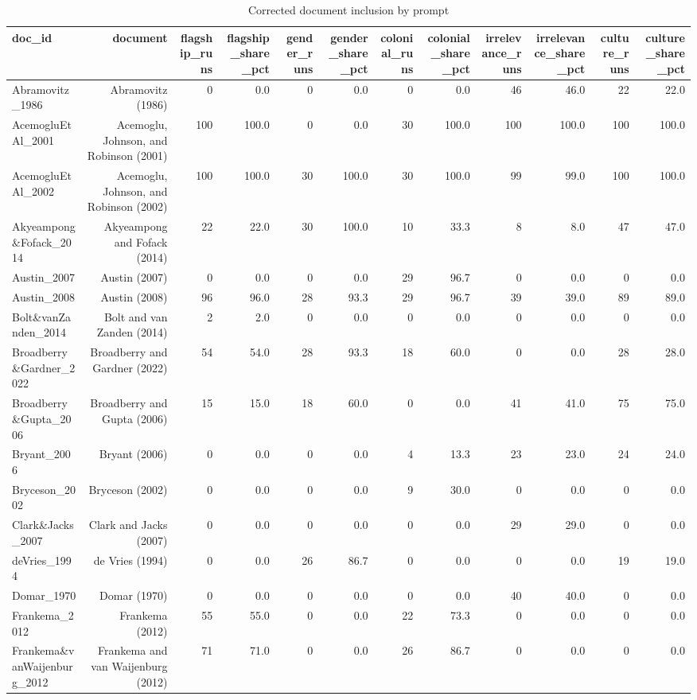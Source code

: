 \begin{table}[ht]
\centering
\caption{Corrected document inclusion by prompt}
\scriptsize
\begin{tabular}{lrrrrrrrrrrr}
\toprule
doc\_id & document & flagship\_runs & flagship\_share\_pct & gender\_runs & gender\_share\_pct & colonial\_runs & colonial\_share\_pct & irrelevance\_runs & irrelevance\_share\_pct & culture\_runs & culture\_share\_pct \\
\midrule
Abramovitz\_1986 & Abramovitz (1986) & 0 & 0.0 & 0 & 0.0 & 0 & 0.0 & 46 & 46.0 & 22 & 22.0 \\
AcemogluEtAl\_2001 & Acemoglu, Johnson, and Robinson (2001) & 100 & 100.0 & 0 & 0.0 & 30 & 100.0 & 100 & 100.0 & 100 & 100.0 \\
AcemogluEtAl\_2002 & Acemoglu, Johnson, and Robinson (2002) & 100 & 100.0 & 30 & 100.0 & 30 & 100.0 & 99 & 99.0 & 100 & 100.0 \\
Akyeampong\&Fofack\_2014 & Akyeampong and Fofack (2014) & 22 & 22.0 & 30 & 100.0 & 10 & 33.3 & 8 & 8.0 & 47 & 47.0 \\
Austin\_2007 & Austin (2007) & 0 & 0.0 & 0 & 0.0 & 29 & 96.7 & 0 & 0.0 & 0 & 0.0 \\
Austin\_2008 & Austin (2008) & 96 & 96.0 & 28 & 93.3 & 29 & 96.7 & 39 & 39.0 & 89 & 89.0 \\
Bolt\&vanZanden\_2014 & Bolt and van Zanden (2014) & 2 & 2.0 & 0 & 0.0 & 0 & 0.0 & 0 & 0.0 & 0 & 0.0 \\
Broadberry\&Gardner\_2022 & Broadberry and Gardner (2022) & 54 & 54.0 & 28 & 93.3 & 18 & 60.0 & 0 & 0.0 & 28 & 28.0 \\
Broadberry\&Gupta\_2006 & Broadberry and Gupta (2006) & 15 & 15.0 & 18 & 60.0 & 0 & 0.0 & 41 & 41.0 & 75 & 75.0 \\
Bryant\_2006 & Bryant (2006) & 0 & 0.0 & 0 & 0.0 & 4 & 13.3 & 23 & 23.0 & 24 & 24.0 \\
Bryceson\_2002 & Bryceson (2002) & 0 & 0.0 & 0 & 0.0 & 9 & 30.0 & 0 & 0.0 & 0 & 0.0 \\
Clark\&Jacks\_2007 & Clark and Jacks (2007) & 0 & 0.0 & 0 & 0.0 & 0 & 0.0 & 29 & 29.0 & 0 & 0.0 \\
deVries\_1994 & de Vries (1994) & 0 & 0.0 & 26 & 86.7 & 0 & 0.0 & 0 & 0.0 & 19 & 19.0 \\
Domar\_1970 & Domar (1970) & 0 & 0.0 & 0 & 0.0 & 0 & 0.0 & 40 & 40.0 & 0 & 0.0 \\
Frankema\_2012 & Frankema (2012) & 55 & 55.0 & 0 & 0.0 & 22 & 73.3 & 0 & 0.0 & 0 & 0.0 \\
Frankema\&vanWaijenburg\_2012 & Frankema and van Waijenburg (2012) & 71 & 71.0 & 0 & 0.0 & 26 & 86.7 & 0 & 0.0 & 0 & 0.0 \\

\end{tabular}
\end{table}
